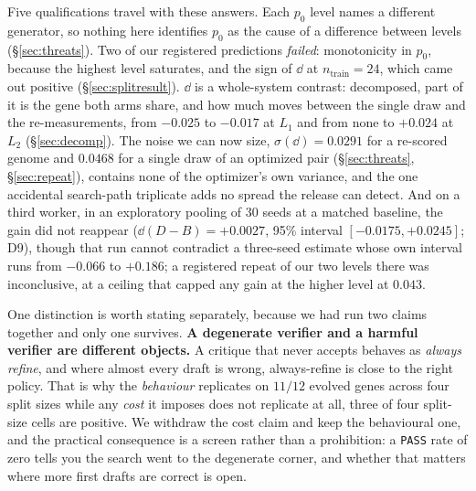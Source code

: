 \documentclass[11pt]{article}
\begin{document}
Five qualifications travel with these answers. Each $p_0$ level names a different generator, so
nothing here identifies $p_0$ as the cause of a difference between levels (\S\ref{sec:threats}).
Two of our registered predictions \emph{failed}: monotonicity in $p_0$, because the highest level
saturates, and the sign of $\dd$ at $n_{\mathrm{train}}{=}24$, which came out positive
(\S\ref{sec:splitresult}). $\dd$ is a whole-system contrast: decomposed, part of it is the gene
both arms share, and how much moves between the single draw and the re-measurements, from
$-0.025$ to $-0.017$ at $L_1$ and from none to $+0.024$ at $L_2$ (\S\ref{sec:decomp}). The noise
we can now size, $\sigma(\dd) = 0.0291$ for a re-scored genome and $0.0468$ for a single draw of
an optimized pair (\S\ref{sec:threats}, \S\ref{sec:repeat}), contains none of the optimizer's own
variance, and the one accidental search-path triplicate adds no spread the release can detect.
And on a third worker, in an exploratory pooling of $30$ seeds at a matched baseline, the gain
did not reappear ($\dd(D-B) = +0.0027$, 95\% interval $[-0.0175, +0.0245]$; D9), though that run
cannot contradict a three-seed estimate whose own interval runs from $-0.066$ to $+0.186$; a
registered repeat of our two levels there was inconclusive, at a ceiling that
capped any gain at the higher level at $0.043$.

One distinction is worth stating separately, because we had run two claims together and only one
survives. \textbf{A degenerate verifier and a harmful verifier are different objects.} A critique
that never accepts behaves as \emph{always refine}, and where almost every draft is
wrong, always-refine is close to the right policy. That is why the \emph{behaviour} replicates on
$11/12$ evolved genes across four split sizes while any \emph{cost} it imposes does not replicate
at all, three of four split-size cells are positive. We withdraw the cost claim and keep the
behavioural one, and the practical consequence is a screen rather than a prohibition: a
\texttt{PASS} rate of zero tells you the search went to the degenerate corner, and whether that
matters where more first drafts are correct is open.
\end{document}
